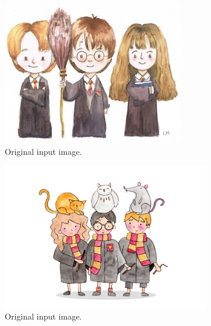 \documentclass[11pt]{article}
\begin{document}
\begin{figure}[h!]
	\centering
	\begin{subfigure}[b]{0.4\linewidth}
		\includegraphics[width=\linewidth]{harry1.jpg}
		\caption{Original input image.}
	\end{subfigure}
	\begin{subfigure}[b]{0.4\linewidth}
		\includegraphics[width=\linewidth]{harry2.jpg}
		\caption{Original input image.}
	\end{subfigure}
	\begin{subfigure}[b]{0.4\linewidth}

\end{subfigure}
\end{figure}
\end{document}

